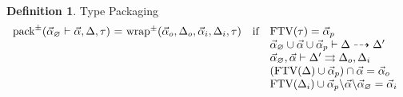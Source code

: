 \documentclass[acmsmall]{acmart}
\theoremstyle{definition}
\newtheorem{definition}{Definition}[section]
\begin{document}
\begin{definition}
  \label{def:type_packaging}
  Type Packaging 
  \hfill
  \\
  \[
  \begin{array}[t]{r@{}c@{}lcl}
      \text{pack}^\pm(\vec{\alpha}_\ignore \entails \vec{\alpha}, \Delta, \tau) 
      &\ =\ & 
      \text{wrap}^{\pm}(\vec{\alpha}_o, \Delta_o, \vec{\alpha}_i, \Delta_i, \tau)
      &\text{if}& 
      \begin{array}[t]{@{}l}
        \text{FTV}(\tau) = \vec{\alpha}_p
        \\
        \vec{\alpha}_\ignore \cup \vec{\alpha} \cup \vec{\alpha}_p \entails \Delta \dashrightarrow \Delta' 
        \\
        \vec{\alpha}_\ignore, \vec{\alpha} \entails \Delta' \rightrightarrows \Delta_o, \Delta_i 
        \\
        (\text{FTV}(\Delta) \cup \vec{\alpha}_p) \cap \vec{\alpha} = \vec{\alpha}_o 
        \\
        \text{FTV}(\Delta_i) \cup \vec{\alpha}_p \backslash \vec{\alpha} \backslash \vec{\alpha}_\ignore = \vec{\alpha}_i 
      \end{array}
  \end{array}
  \]
\end{definition}
\end{document}
